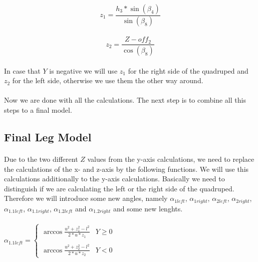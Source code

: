 \documentclass{article}
\begin{document}
    \paragraph{}
    \begin{equation}
        z_1 = \frac{h_3 * \sin(\beta_4)}{\sin(\beta_8)}
    \end{equation}

    \paragraph{}
    \begin{equation}
        z_2 = \frac{Z - off_2}{\cos(\beta_8)}
    \end{equation}

    \paragraph{}
    In case that $Y$ is negative we will use $z_1$ for the right side of the quadruped and $z_2$ for the left side, otherwise we use them the other way around.

    \paragraph{}
    Now we are done with all the calculations. The next step is to combine all this steps to a final model. 
    


    \pagebreak
    \subsection{Final Leg Model}
    \paragraph{}
    Due to the two different $Z$ values from the y-axis calculations, we need to replace the calculations of the x- and z-axis by the following functions. We will use this calculations additionally to the y-axis calculations. Basically we need to distinguish if we are calculating the left or the right side of the quadruped. Therefore we will introduce some new angles, namely $\alpha_{1left}$, $\alpha_{1right}$, $\alpha_{2left}$, $\alpha_{2right}$, $\alpha_{1.1left}$, $\alpha_{1.1right}$, $\alpha_{1.2left}$ and $\alpha_{1.2right}$ and some new lenghts.

    \paragraph{}
    $\alpha_{1.1left} = \left\{
    \begin{array}{ll}
    \arccos \frac{u^2 + z_1^2 - l^2}{2 * u * z_1} & Y \ge 0 \\ \\
    \arccos \frac{u^2 + z_2^2 - l^2}{2 * u * z_2} & Y < 0
    \end{array}
    \right. $ 
\end{document}
